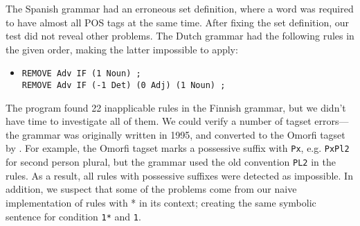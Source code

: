 The Spanish grammar had an erroneous set definition, where a word was
required to have almost all POS tags at the same time. After fixing
the set definition, our test did not reveal other problems.
The Dutch grammar had the following rules in the given order, making the latter impossible to apply:
\begin{itemize}
\item[] 
\begin{verbatim}REMOVE Adv IF (1 Noun) ;
REMOVE Adv IF (-1 Det) (0 Adj) (1 Noun) ;
\end{verbatim}
\end{itemize}

The program found 22 inapplicable rules in the Finnish grammar, but we
didn't have time to investigate all of them.
We could verify a number of tagset errors---the grammar was originally written in 1995, and converted to the Omorfi tagset by \cite{pirinen2015}. 
For example, the Omorfi tagset marks a possessive suffix with \texttt{Px}, e.g. \texttt{PxPl2} for second person plural, but the grammar used the old convention \texttt{PL2} in the rules.
As a result, all rules with possessive suffixes were detected as impossible.
In addition, we suspect that some of the problems come from our naive
implementation of rules with * in its context; creating the same
symbolic sentence for condition \texttt{1*} and \texttt{1}.

